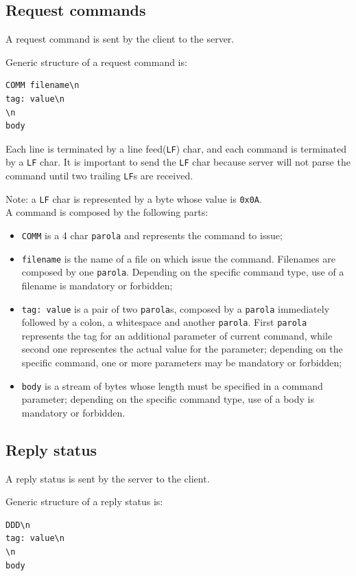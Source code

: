 \documentclass[a4paper,12pt]{article}
\begin{document}
\subsection{Request commands}
A request command is sent by the client to the server.

Generic structure of a request command is:
\begin{verbatim}
COMM filename\n
tag: value\n
\n
body
\end{verbatim}

Each line is terminated by a line feed(\texttt{LF}) char, and each command is terminated by a \texttt{LF} char.
It is important to send the \texttt{LF} char because server will not parse the command until two trailing \texttt{LF}s are received.

Note: a \texttt{LF} char is represented by a byte whose value is \texttt{0x0A}.
\\
A command is composed by the following parts:
\begin{itemize}
  \item \texttt{COMM} is a 4 char \texttt{parola} and represents the command to issue;
  \item \texttt{filename} is the name of a file on which issue the command.
  Filenames are composed by one \texttt{parola}.
  Depending on the specific command type, use of a filename is mandatory or forbidden;
  \item \texttt{tag: value} is a pair of two \texttt{parola}s, composed by a \texttt{parola} immediately followed by a colon, a whitespace and another \texttt{parola}.
  First \texttt{parola} represents the tag for an additional parameter of current command, while second one representes the actual value for the parameter; depending on the specific command, one or more parameters may be mandatory or forbidden;
  \item \texttt{body} is a stream of bytes whose length must be specified in a command parameter; depending on the specific command type, use of a body is mandatory or forbidden.
\end{itemize}

\subsection{Reply status}
A reply status is sent by the server to the client.

Generic structure of a reply status is:

\begin{verbatim}
DDD\n
tag: value\n
\n
body
\end{verbatim}
\end{document}
